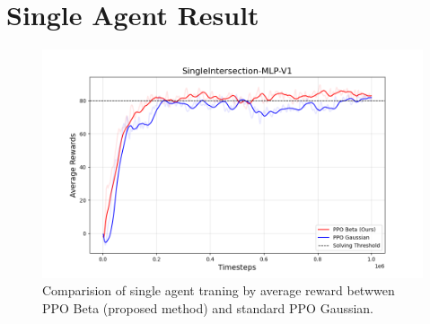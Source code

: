 \section{Single Agent Result}\label{sec:single-agent-result}
\begin{figure}[H]
    \centering
    \includegraphics[width=14cm]{assets/ppo_single}
    \caption{Comparision of single agent traning by average reward betwwen
    PPO Beta (proposed method) and standard PPO Gaussian.}\label{fig:single_agent_training_reward}
\end{figure}

